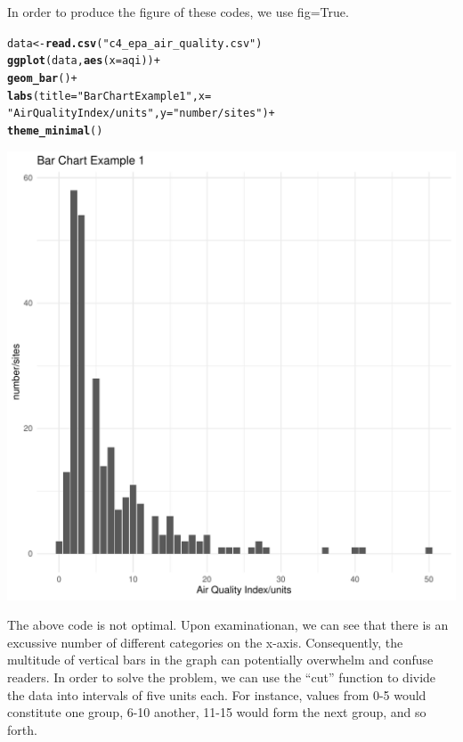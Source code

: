 \documentclass{article}\usepackage[]{graphicx}\usepackage[]{xcolor}
\makeatletter
\def\maxwidth{ %
  \ifdim\Gin@nat@width>\linewidth
    \linewidth
  \else
    \Gin@nat@width
  \fi
}
\newcommand{\hlstr}[1]{\textcolor[rgb]{0.192,0.494,0.8}{#1}}%
\newcommand{\hlopt}[1]{\textcolor[rgb]{0,0,0}{#1}}%
\newcommand{\hlstd}[1]{\textcolor[rgb]{0.345,0.345,0.345}{#1}}%
\newcommand{\hlkwb}[1]{\textcolor[rgb]{0.69,0.353,0.396}{#1}}%
\newcommand{\hlkwc}[1]{\textcolor[rgb]{0.333,0.667,0.333}{#1}}%
\newcommand{\hlkwd}[1]{\textcolor[rgb]{0.737,0.353,0.396}{\textbf{#1}}}%
\newenvironment{kframe}{%
 \def\at@end@of@kframe{}%
 \ifinner\ifhmode%
  \def\at@end@of@kframe{\end{minipage}}%
  \begin{minipage}{\columnwidth}%
 \fi\fi%
 \def\FrameCommand##1{\hskip\@totalleftmargin \hskip-\fboxsep
 \colorbox{shadecolor}{##1}\hskip-\fboxsep
     \hskip-\linewidth \hskip-\@totalleftmargin \hskip\columnwidth}%
 \MakeFramed {\advance\hsize-\width
   \@totalleftmargin\z@ \linewidth\hsize
   \@setminipage}}%
 {\par\unskip\endMakeFramed%
 \at@end@of@kframe}
\newenvironment{knitrout}{}{} %
\makeatother
\begin{document}
In order to produce the figure of these codes, we use fig=True.
\begin{knitrout}
\color{fgcolor}\begin{kframe}
\begin{alltt}
\hlstd{data} \hlkwb{<-} \hlkwd{read.csv}\hlstd{(}\hlstr{"c4_epa_air_quality.csv"}\hlstd{)}
\hlkwd{ggplot}\hlstd{(data,} \hlkwd{aes}\hlstd{(}\hlkwc{x} \hlstd{= aqi))} \hlopt{+}
  \hlkwd{geom_bar}\hlstd{()} \hlopt{+}
  \hlkwd{labs}\hlstd{(}\hlkwc{title} \hlstd{=} \hlstr{"Bar Chart Example 1"}\hlstd{,} \hlkwc{x} \hlstd{=}
         \hlstr{"Air Quality Index/units"}\hlstd{,} \hlkwc{y} \hlstd{=} \hlstr{"number/sites"}\hlstd{)} \hlopt{+}
  \hlkwd{theme_minimal}\hlstd{()}
\end{alltt}
\end{kframe}
\includegraphics[width=\maxwidth]{figure/my_plot1-1} 
\end{knitrout}

The above code is not optimal. Upon examinationan, we can see that there is an excussive number of different categories on the x-axis. Consequently, the multitude of vertical bars in the graph can potentially overwhelm and confuse readers. 
In order to solve the problem, we can use the “cut” function to divide the data into intervals of five units each. For instance, values from 0-5 would constitute one group, 6-10 another, 11-15 would form the next group, and so forth.
\end{document}
